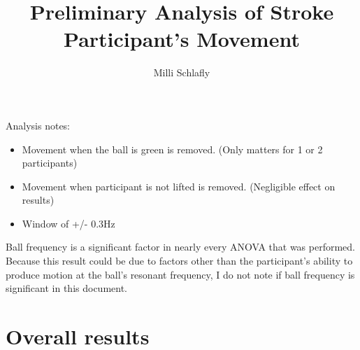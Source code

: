 \documentclass{article}
\title{Preliminary Analysis of Stroke Participant's Movement}
\author{Milli Schlafly}
\begin{document}
\maketitle

Analysis notes:
\begin{itemize}
	\item Movement when the ball is green is removed. (Only matters for 1 or 2 participants)
	\item Movement when participant is not lifted is removed. (Negligible effect on results)
	\item Window of +/- 0.3Hz
\end{itemize}

Ball frequency is a significant factor in nearly every ANOVA that was performed. Because this result could be due to factors other than the participant's ability to produce motion at the ball's resonant frequency, I do not note if ball frequency is significant in this document. 


\section{Overall results}
\end{document}
